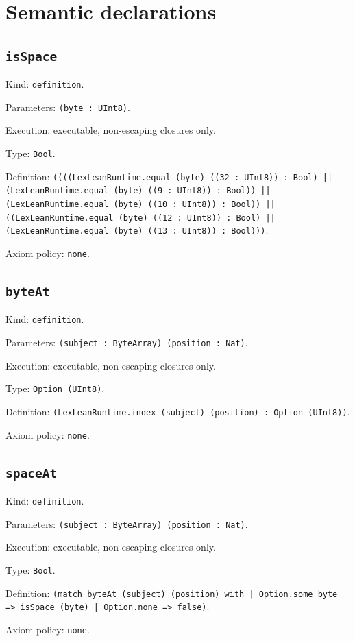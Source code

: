 \documentclass[11pt]{article}
\begin{document}
\section*{Semantic declarations}
\subsection*{\texttt{isSpace}}
\noindent Kind: \texttt{definition}.\par
\noindent Parameters: \texttt{(byte : UInt8)}.\par
\noindent Execution: executable, non-escaping closures only.\par
\noindent Type: \texttt{Bool}.\par
\noindent Definition: \texttt{((((LexLeanRuntime.equal (byte) ((32 : UInt8)) : Bool) || (LexLeanRuntime.equal (byte) ((9 : UInt8)) : Bool)) || (LexLeanRuntime.equal (byte) ((10 : UInt8)) : Bool)) || ((LexLeanRuntime.equal (byte) ((12 : UInt8)) : Bool) || (LexLeanRuntime.equal (byte) ((13 : UInt8)) : Bool)))}.\par
\noindent Axiom policy: \texttt{none}.\par
\subsection*{\texttt{byteAt}}
\noindent Kind: \texttt{definition}.\par
\noindent Parameters: \texttt{(subject : ByteArray) (position : Nat)}.\par
\noindent Execution: executable, non-escaping closures only.\par
\noindent Type: \texttt{Option (UInt8)}.\par
\noindent Definition: \texttt{(LexLeanRuntime.index (subject) (position) : Option (UInt8))}.\par
\noindent Axiom policy: \texttt{none}.\par
\subsection*{\texttt{spaceAt}}
\noindent Kind: \texttt{definition}.\par
\noindent Parameters: \texttt{(subject : ByteArray) (position : Nat)}.\par
\noindent Execution: executable, non-escaping closures only.\par
\noindent Type: \texttt{Bool}.\par
\noindent Definition: \texttt{(match byteAt (subject) (position) with | Option.some byte => isSpace (byte) | Option.none => false)}.\par
\noindent Axiom policy: \texttt{none}.\par
\end{document}
